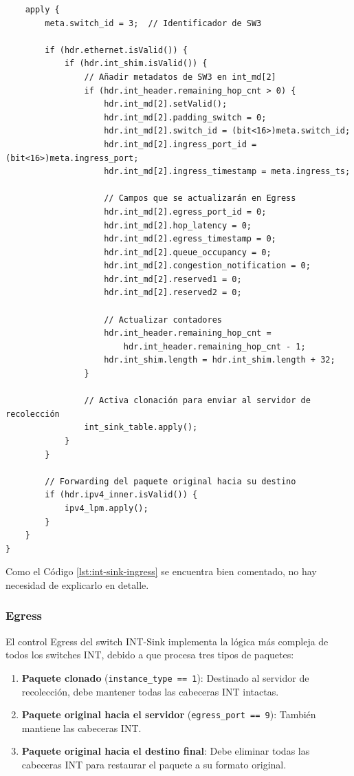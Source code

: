 \begin{lstlisting}
    apply {
        meta.switch_id = 3;  // Identificador de SW3

        if (hdr.ethernet.isValid()) {
            if (hdr.int_shim.isValid()) {
                // Añadir metadatos de SW3 en int_md[2]
                if (hdr.int_header.remaining_hop_cnt > 0) {
                    hdr.int_md[2].setValid();
                    hdr.int_md[2].padding_switch = 0;
                    hdr.int_md[2].switch_id = (bit<16>)meta.switch_id;
                    hdr.int_md[2].ingress_port_id = (bit<16>)meta.ingress_port;
                    hdr.int_md[2].ingress_timestamp = meta.ingress_ts;
                    
                    // Campos que se actualizarán en Egress
                    hdr.int_md[2].egress_port_id = 0;
                    hdr.int_md[2].hop_latency = 0;
                    hdr.int_md[2].egress_timestamp = 0;
                    hdr.int_md[2].queue_occupancy = 0;
                    hdr.int_md[2].congestion_notification = 0;
                    hdr.int_md[2].reserved1 = 0;
                    hdr.int_md[2].reserved2 = 0;

                    // Actualizar contadores
                    hdr.int_header.remaining_hop_cnt = 
                        hdr.int_header.remaining_hop_cnt - 1;
                    hdr.int_shim.length = hdr.int_shim.length + 32;
                }

                // Activa clonación para enviar al servidor de recolección
                int_sink_table.apply();
            }
        }

        // Forwarding del paquete original hacia su destino
        if (hdr.ipv4_inner.isValid()) {
            ipv4_lpm.apply();
        }
    }
}
\end{lstlisting}

Como el Código \ref{lst:int-sink-ingress} se encuentra bien comentado, no hay necesidad de explicarlo en detalle.

\subsubsection{Egress}
El control Egress del switch INT-Sink implementa la lógica más compleja de todos los switches INT, debido a que procesa tres tipos de paquetes:

\begin{enumerate}
    \item \textbf{Paquete clonado} (\texttt{instance\_type == 1}): Destinado al servidor de recolección, debe mantener todas las cabeceras INT intactas.
    \item \textbf{Paquete original hacia el servidor} (\texttt{egress\_port == 9}): También mantiene las cabeceras INT.
    \item \textbf{Paquete original hacia el destino final}: Debe eliminar todas las cabeceras INT para restaurar el paquete a su formato original.
\end{enumerate}

